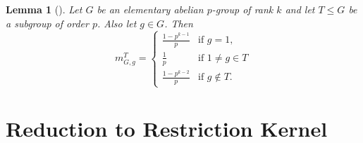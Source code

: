 \documentclass[12pt]{article}
\theoremstyle{plain}
\newtheorem{lemma}[theorem]{Lemma}
\theoremstyle{definition}
\begin{document}
\begin{lemma}[\cite{CoYi}]\label{lem:defnoelem}
    Let $G$ be an elementary abelian $p$-group of rank $k$ and let $T\le G$ be a subgroup of order $p$. Also let $g\in G$. Then
    \[
    m_{G, g}^T = \begin{cases}
              \frac{1-p^{k-1}}{p} & \text{if } g = 1,\\
              \frac{1}{p} & \text{if } 1\not = g\in T\\
            \frac{1 - p^{k-2}}{p} & \text{if } g\not\in T.
          \end{cases} 
    \]
    
\end{lemma}


\section{Reduction to Restriction Kernel}\label{sec:reduc1}
\end{document}
